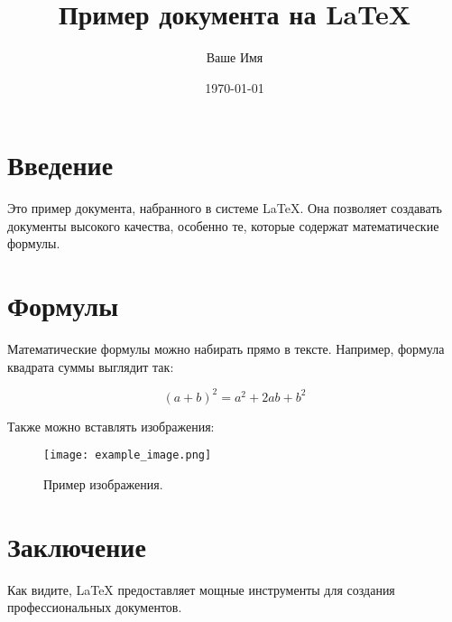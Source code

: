 \documentclass{article}
\begin{document}
\title{Пример документа на LaTeX}
\author{Ваше Имя}
\date{\today} %

\maketitle

\section{Введение}
Это пример документа, набранного в системе \LaTeX. Она позволяет создавать документы высокого качества, особенно те, которые содержат математические формулы.

\section{Формулы}
Математические формулы можно набирать прямо в тексте. Например, формула квадрата суммы выглядит так:

\[
(a + b)^2 = a^2 + 2ab + b^2
\]

Также можно вставлять изображения:

\begin{figure}[h!]
\centering
\texttt{[image: example\_image.png]}
\caption{Пример изображения.}
\label{fig:example_image}
\end{figure}

\section{Заключение}
Как видите, LaTeX предоставляет мощные инструменты для создания профессиональных документов.
\end{document}
